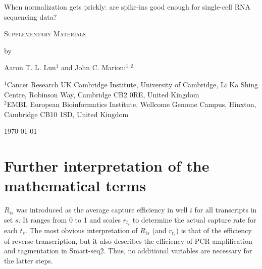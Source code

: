 \documentclass{article}
\begin{document}
\begin{titlepage}
\vspace*{3cm}
\begin{center}

{\LARGE
When normalization gets prickly: are spike-ins good enough for single-cell RNA sequencing data?
\par}

\vspace{0.75cm}

{\Large 
    \textsc{Supplementary Materials}
\par
}
\vspace{0.75cm}

\large
by


\vspace{0.75cm}
Aaron T. L. Lun$^{1}$ and John C. Marioni$^{1,2}$

\vspace{1cm}
\begin{minipage}{0.9\textwidth}
\begin{flushleft} 
$^1$Cancer Research UK Cambridge Institute, University of Cambridge, Li Ka Shing Centre, Robinson Way, Cambridge CB2 0RE, United Kingdom \\[6pt]
$^2$EMBL European Bioinformatics Institute, Wellcome Genome Campus, Hinxton, Cambridge CB10 1SD, United Kingdom \\[6pt]
\end{flushleft}
\end{minipage}

\vspace{1.5cm}
{\large \today{}}

\vspace*{\fill}
\end{center}
\end{titlepage}

\newcommand\variance{\mbox{var}}

\section{Further interpretation of the mathematical terms}
$R_{is}$ was introduced as the average capture efficiency in well $i$ for all transcripts in set $s$.
It ranges from 0 to 1 and scales $r_{t_s}$ to determine the actual capture rate for each $t_s$.
The most obvious interpretation of $R_{is}$ (and $r_{t_s}$) is that of the efficiency of reverse transcription, but it also describes the efficiency of PCR amplification and tagmentation in Smart-seq2.
Thus, no additional variables are necessary for the latter steps.
\end{document}
